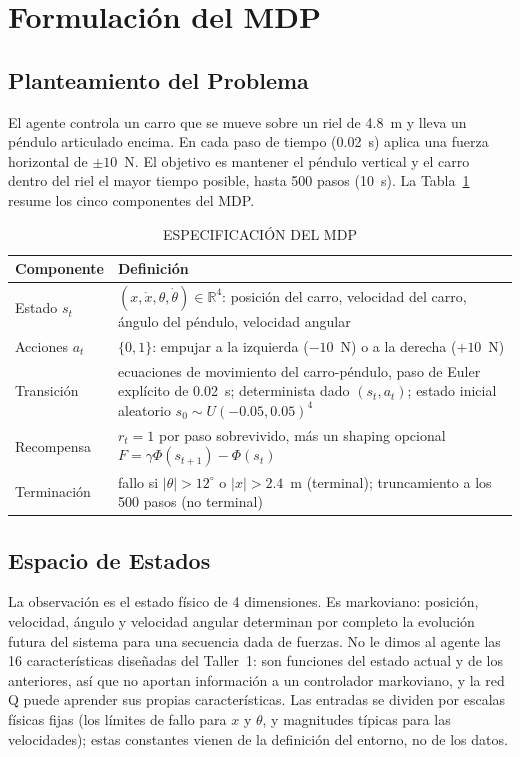 \documentclass[conference]{IEEEtran}
\begin{document}
\section{Formulación del MDP}

\subsection{Planteamiento del Problema}
El agente controla un carro que se mueve sobre un riel de 4.8~m y lleva un péndulo
articulado encima. En cada paso de tiempo (0.02~s) aplica una fuerza horizontal de
$\pm 10$~N. El objetivo es mantener el péndulo vertical y el carro dentro del riel el mayor
tiempo posible, hasta 500 pasos (10~s). La Tabla~\ref{tab:mdp} resume los cinco componentes
del MDP.

\begin{table}[t]
\caption{ESPECIFICACIÓN DEL MDP}
\label{tab:mdp}
\centering
\small
\begin{tabular}{|p{1.5cm}|p{5.9cm}|}
\hline
\textbf{Componente} & \textbf{Definición} \\ \hline
Estado $s_t$ & $(x, \dot x, \theta, \dot\theta) \in \mathbb{R}^4$: posición del carro, velocidad del carro, ángulo del péndulo, velocidad angular \\ \hline
Acciones $a_t$ & $\{0, 1\}$: empujar a la izquierda ($-10$~N) o a la derecha ($+10$~N) \\ \hline
Transición & ecuaciones de movimiento del carro-péndulo, paso de Euler explícito de 0.02~s; determinista dado $(s_t, a_t)$; estado inicial aleatorio $s_0 \sim U(-0.05, 0.05)^4$ \\ \hline
Recompensa & $r_t = 1$ por paso sobrevivido, más un shaping opcional $F = \gamma\Phi(s_{t+1}) - \Phi(s_t)$ \\ \hline
Terminación & fallo si $|\theta| > 12^\circ$ o $|x| > 2.4$~m (terminal); truncamiento a los 500 pasos (no terminal) \\ \hline
\end{tabular}
\end{table}

\subsection{Espacio de Estados}
La observación es el estado físico de 4 dimensiones. Es markoviano: posición, velocidad,
ángulo y velocidad angular determinan por completo la evolución futura del sistema para una
secuencia dada de fuerzas. No le dimos al agente las 16 características diseñadas del
Taller~1: son funciones del estado actual y de los anteriores, así que no aportan
información a un controlador markoviano, y la red Q puede aprender sus propias
características. Las entradas se dividen por escalas físicas fijas (los límites de fallo
para $x$ y $\theta$, y magnitudes típicas para las velocidades); estas constantes vienen de
la definición del entorno, no de los datos.
\end{document}
